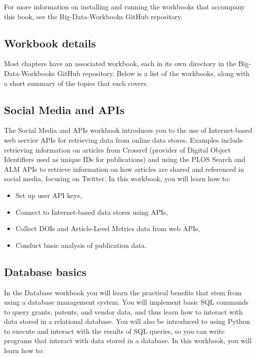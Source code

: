 \documentclass[]{krantz}
\begin{document}
For more information on installing and running the workbooks that
accompany this book, see the Big-Data-Workbooks GitHub repository.

\subsection{Workbook details}\label{workbook-details}

Most chapters have an associated workbook, each in its own directory in
the Big-Data-Workbooks GitHub repository. Below is a list of the
workbooks, along with a short summary of the topics that each covers.

\subsection{Social Media and APIs}\label{social-media-and-apis}

The Social Media and APIs workbook introduces you to the use of
Internet-based web service APIs for retrieving data from online data
stores. Examples include retrieving information on articles from
Crossref (provider of Digital Object Identifiers used as unique IDs for
publications) and using the PLOS Search and ALM APIs to retrieve
information on how articles are shared and referenced in social media,
focusing on Twitter. In this workbook, you will learn how to:

\begin{itemize}
\item
  Set up user API keys,
\item
  Connect to Internet-based data stores using APIs,
\item
  Collect DOIs and Article-Level Metrics data from web APIs,
\item
  Conduct basic analysis of publication data.
\end{itemize}

\subsection{Database basics}\label{database-basics}

In the Database workbook you will learn the practical benefits that stem
from using a database management system. You will implement basic SQL
commands to query grants, patents, and vendor data, and thus learn how
to interact with data stored in a relational database. You will also be
introduced to using Python to execute and interact with the results of
SQL queries, so you can write programs that interact with data stored in
a database. In this workbook, you will learn how to:
\end{document}
